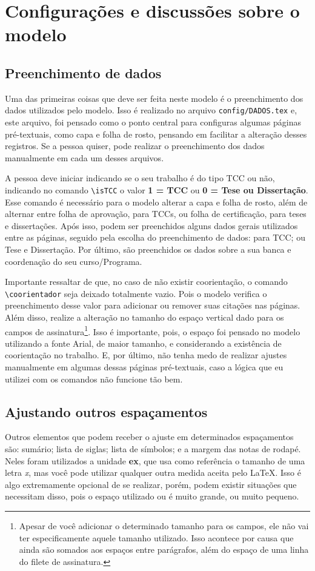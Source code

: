 \chapter{Configurações e discussões sobre o modelo}\label{capitulo:configuracao}
\section{Preenchimento de dados}
Uma das primeiras coisas que deve ser feita neste modelo é o preenchimento dos dados utilizados pelo modelo. Isso é realizado no arquivo \texttt{config/DADOS.tex} e, este arquivo, foi pensado como o ponto central para configuras algumas páginas pré-textuais, como capa e folha de rosto, pensando em facilitar a alteração desses registros. Se a pessoa quiser, pode realizar o preenchimento dos dados manualmente em cada um desses arquivos.

A pessoa deve iniciar indicando se o seu trabalho é do tipo TCC ou não, indicando no comando \verb|\isTCC| o valor \textbf{1 = TCC} ou \textbf{0 = Tese ou Dissertação}. Esse comando é necessário para o modelo alterar a capa e folha de rosto, além de alternar entre folha de aprovação, para TCCs, ou folha de certificação, para teses e dissertações. Após isso, podem ser preenchidos alguns dados gerais utilizados entre as páginas, seguido pela escolha do preenchimento de dados: para TCC; ou Tese e Dissertação. Por último, são preenchidos os dados sobre a sua banca e coordenação do seu curso/Programa.

Importante ressaltar de que, no caso de não existir coorientação, o comando \verb|\coorientador| seja deixado totalmente vazio. Pois o modelo verifica o preenchimento desse valor para adicionar ou remover suas citações nas páginas. Além disso, realize a alteração no tamanho do espaço vertical dado para os campos de assinatura\footnote{Apesar de você adicionar o determinado tamanho para os campos, ele não vai ter especificamente aquele tamanho utilizado. Isso acontece por causa que ainda são somados aos espaços entre parágrafos, além do espaço de uma linha do filete de assinatura.}. Isso é importante, pois, o espaço foi pensado no modelo utilizando a fonte Arial, de maior tamanho, e considerando a existência de coorientação no trabalho. E, por último, não tenha medo de realizar ajustes manualmente em algumas dessas páginas pré-textuais, caso a lógica que eu utilizei com os comandos não funcione tão bem.

\section{Ajustando outros espaçamentos}
Outros elementos que podem receber o ajuste em determinados espaçamentos são: sumário; lista de siglas; lista de símbolos; e a margem das notas de rodapé. Neles foram utilizados a unidade \textbf{ex}, que usa como referência o tamanho de uma letra \textit{x}, mas você pode utilizar qualquer outra medida aceita pelo \LaTeX. Isso é algo extremamente opcional de se realizar, porém, podem existir situações que necessitam disso, pois o espaço utilizado ou é muito grande, ou muito pequeno.

